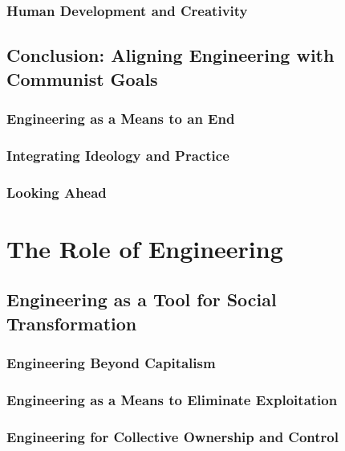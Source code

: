 \subsubsection{Human Development and Creativity}

\newpage

\subsection{Conclusion: Aligning Engineering with Communist Goals}

\subsubsection{Engineering as a Means to an End}

\subsubsection{Integrating Ideology and Practice}

\subsubsection{Looking Ahead}

\newpage

\section{The Role of Engineering}

\subsection{Engineering as a Tool for Social Transformation}

\subsubsection{Engineering Beyond Capitalism}

\subsubsection{Engineering as a Means to Eliminate Exploitation}

\subsubsection{Engineering for Collective Ownership and Control}

